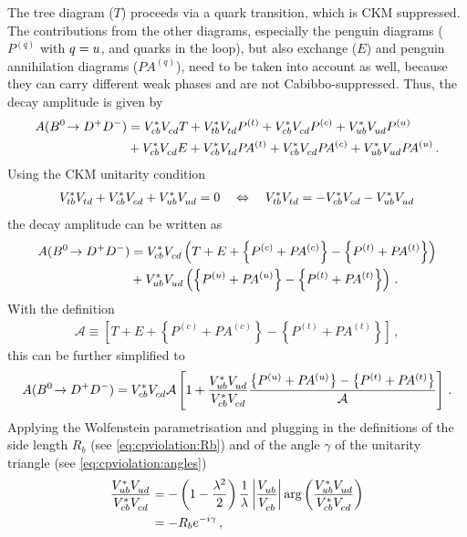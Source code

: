 The tree diagram ($T$) proceeds via a \bToccbard quark transition, which is
CKM suppressed. The contributions from the other diagrams, especially the
penguin diagrams ($P^{(q)}$ with $q = {u}$, \cquark and \tquark quarks in the
loop), but also exchange ($E$) and penguin annihilation diagrams
($P\!A^{(q)}$), need to be taken into account as well, because they can carry
different weak phases and are not Cabibbo-suppressed. Thus, the decay
amplitude is given by~\cite{Fleischer1999,Fleischer2007,Bel:2015wha}
\begin{align}
\begin{split}
	A({{B}^0}\!\rightarrow {\ensuremath{{D}^+}}{\ensuremath{{D}^-}}) &= {V_{{c}{b}}^\ast}{V_{{c}{d}}^{}} T + {V_{{t}{b}}^\ast}{V_{{t}{d}}^{}} P^{(t)} + {V_{{c}{b}}^\ast}{V_{{c}{d}}^{}} P^{(c)} + {V_{{u}{b}}^\ast}{V_{{u}{d}}^{}} P^{(u)}\\
			   &+ {V_{{c}{b}}^\ast}{V_{{c}{d}}^{}} E + {V_{{c}{b}}^\ast}{V_{{t}{d}}^{}} P\!A^{(t)} + {V_{{c}{b}}^\ast}{V_{{c}{d}}^{}} P\!A^{(c)} + {V_{{u}{b}}^\ast}{V_{{u}{d}}^{}} P\!A^{(u)}\,.
\end{split}
\end{align}
Using the CKM unitarity condition
\begin{align}
	{\ensuremath{V_{{t}{b}}^\ast}}{\ensuremath{V_{{t}{d}}^{}}} + {V_{{c}{b}}^\ast}{V_{{c}{d}}^{}} + {V_{{u}{b}}^\ast}{V_{{u}{d}}^{}} = 0 \quad\Leftrightarrow\quad {\ensuremath{V_{{t}{b}}^\ast}}{\ensuremath{V_{{t}{d}}^{}}} = - {V_{{c}{b}}^\ast}{V_{{c}{d}}^{}} - {V_{{u}{b}}^\ast}{V_{{u}{d}}^{}}
\end{align}
the decay amplitude can be written as
\begin{align}
\begin{split}
	A({{B}^0}\!\rightarrow {\ensuremath{{D}^+}}{\ensuremath{{D}^-}}) &= {V_{{c}{b}}^\ast}{V_{{c}{d}}^{}} \left(T + E + \left\{P^{(c)} + P\!A^{(c)}\right\} - \left\{P^{(t)} + P\!A^{(t)}\right\}\right)\\
			   &+ {V_{{u}{b}}^\ast}{V_{{u}{d}}^{}} \left(\left\{P^{(u)} + P\!A^{(u)}\right\} - \left\{P^{(t)} + P\!A^{(t)}\right\}\right)\,.
\end{split}
\end{align}
With the definition
\begin{align}
	\mathcal{A} \equiv \left[T + E + \left\{P^{(c)} + P\!A^{(c)}\right\} - \left\{P^{(t)} + P\!A^{(t)}\right\}\right]\,,
\end{align}
this can be further simplified to
\begin{align}
	A({{B}^0}\!\rightarrow {\ensuremath{{D}^+}}{\ensuremath{{D}^-}}) = {V_{{c}{b}}^\ast}{V_{{c}{d}}^{}} \mathcal{A}\left[1 + \frac{{V_{{u}{b}}^\ast}{V_{{u}{d}}^{}}}{{V_{{c}{b}}^\ast}{V_{{c}{d}}^{}}} \frac{\left\{P^{(u)} + P\!A^{(u)}\right\} - \left\{P^{(t)} + P\!A^{(t)}\right\}}{\mathcal{A}}\right]\,.
\end{align}
Applying the Wolfenstein parametrisation and plugging in the definitions of the
side length $R_b$ (see \cref{eq:cpviolation:Rb}) and of the angle $\gamma$ of
the unitarity triangle (see \cref{eq:cpviolation:angles})
\begin{align}
\begin{split}
	\frac{{V_{{u}{b}}^\ast}{V_{{u}{d}}^{}}}{{V_{{c}{b}}^\ast}{V_{{c}{d}}^{}}} &= -\left(1 - \frac{\lambda^2}2\right)\frac 1\lambda \left|\frac {{V_{{u}{b}}^{}}}{{V_{{c}{b}}^{}}}\right| \text{arg}\left(\frac{{V_{{u}{b}}^\ast}{V_{{u}{d}}^{}}}{{V_{{c}{b}}^\ast}{V_{{c}{d}}^{}}}\right)\\
	&= -R_b e^{-i\gamma}\,,
\end{split}
\end{align}
